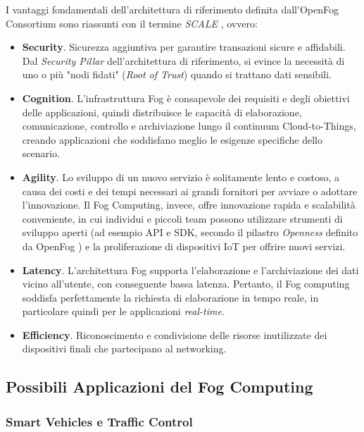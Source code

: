 I vantaggi fondamentali dell'architettura di riferimento definita dall'OpenFog Consortium sono riassunti con il termine \textit{SCALE} \cite{OpenFogReferenceArchitecture}, ovvero:

\begin{itemize}
	\item \textbf{Security}. Sicurezza aggiuntiva per garantire transazioni sicure e affidabili. Dal \textit{Security Pillar} dell'architettura di riferimento, si evince la necessità di uno o più "nodi fidati" (\textit{Root of Trust}) quando si trattano dati sensibili.
	\item \textbf{Cognition}. L'infrastruttura Fog è consapevole dei requisiti e degli obiettivi delle applicazioni, quindi distribuisce le capacità di elaborazione, comunicazione, controllo e archiviazione lungo il continuum Cloud-to-Things, creando applicazioni che soddisfano meglio le esigenze specifiche dello scenario.
	\item \textbf{Agility}. Lo sviluppo di un nuovo servizio è solitamente lento e costoso, a causa dei costi e dei tempi necessari ai grandi fornitori per avviare o adottare l'innovazione. Il Fog Computing, invece, offre innovazione rapida e scalabilità conveniente, in cui individui e piccoli team possono utilizzare strumenti di sviluppo aperti (ad esempio API e SDK, secondo il pilastro \textit{Openness} definito da OpenFog \cite{OpenFogReferenceArchitecture}) e la proliferazione di dispositivi IoT per offrire nuovi servizi.
	\item \textbf{Latency}. L'architettura Fog supporta l'elaborazione e l'archiviazione dei dati vicino all'utente, con conseguente bassa latenza. Pertanto, il Fog computing soddisfa perfettamente la richiesta di elaborazione in tempo reale, in particolare quindi per le applicazioni \textit{real-time}.
	\item \textbf{Efficiency}. Riconoscimento e condivisione delle risorse inutilizzate dei dispositivi finali che partecipano al networking.
\end{itemize}

\subsection{Possibili Applicazioni del Fog Computing}

\subsubsection{Smart Vehicles e Traffic Control}

